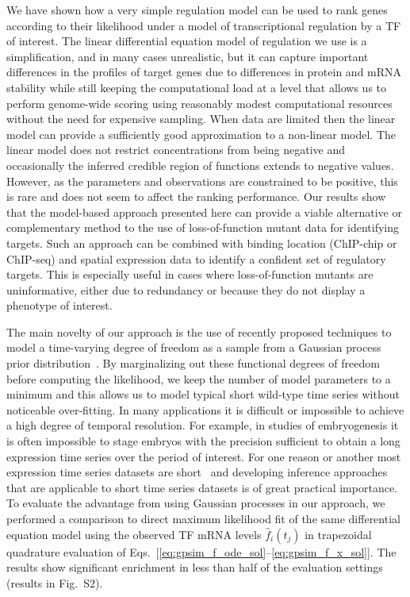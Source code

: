 \documentclass{pnastwo}
\begin{document}
\begin{article}
We have shown how a very simple regulation model can be used to rank
genes according to their likelihood under a model of transcriptional
regulation by a TF of interest. The linear differential equation model of regulation we use
is a simplification, and in many cases unrealistic, but it can capture important differences in
the profiles of target genes due to differences in protein and mRNA
stability while still keeping the computational load at a level
that allows us to perform genome-wide scoring using reasonably modest
computational resources without the need for expensive sampling.
When data are limited then the linear model can provide a sufficiently good
approximation to a non-linear model. 
The linear model does not restrict concentrations from being negative
and occasionally the inferred credible region of functions extends to negative
values. However, as the parameters and observations are constrained to be positive,
this is rare and does not seem to affect the ranking performance. Our
results show that the model-based approach presented here can provide
a viable alternative or complementary method to the use of
loss-of-function mutant data for identifying targets. Such an approach
can be combined with binding location (ChIP-chip or ChIP-seq)
and spatial expression data to identify a confident set of regulatory
targets. This is especially useful in cases where loss-of-function
mutants are uninformative, either due to redundancy or because they do
not display a phenotype of interest. 

The main novelty of our approach is the use of recently proposed
techniques to model a time-varying degree of freedom as a sample from
a Gaussian process prior distribution~\cite{Gao2008}. By marginalizing
out these functional
degrees of freedom before computing the likelihood, we keep the
number of model parameters to a minimum and this allows us to model
typical short wild-type time series without noticeable over-fitting. In
many applications it is difficult or impossible to achieve a high
degree of temporal resolution. For example, in studies of
embryogenesis it is often impossible to stage embryos with the
precision sufficient to obtain a long expression time series over the
period of interest. For one reason or another most expression time
series datasets are short~\cite{Ernst2005} and developing inference approaches
that are applicable to short time series datasets is of great
practical importance. To evaluate the advantage from using Gaussian processes in our
approach, we performed a comparison to direct maximum likelihood fit
of the same differential equation model using the observed TF mRNA
levels $\hat{f}_i(t_j)$ in trapezoidal quadrature evaluation of
Eqs.~[\ref{eq:gpsim_f_ode_sol}--\ref{eq:gpsim_f_x_sol}]. The
results show significant enrichment in less than half of
the evaluation settings (results in Fig.~S2).


\end{article}
\end{document}
